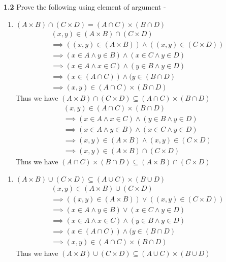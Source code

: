 \documentclass[xcolor=svgnames]{beamer}
\begin{document}
\begin{frame}
\textbf{1.2} Prove the following using element of argument - 
\begin{enumerate}
    \item $(A \times B) \cap (C \times D) = (A \cap C) \times (B \cap D)$
    \begin{align*}
       &(x,y) \in (A \times B) \cap (C \times D) &\\
       &\implies  ((x,y) \in (A \times B)) \land ((x,y) \in (C \times D)) &\\
       &\implies  (x \in A \land y \in B) \land (x \in C \land y \in D) &\\
       &\implies  (x \in A \land x \in C) \land (y \in B \land y \in D) &\\
       &\implies  (x \in (A \cap C)) \land (y \in (B \cap D) &\\
       &\implies  (x,y) \in (A \cap C) \times (B \cap D)&
    \end{align*}
    Thus we have $(A \times B) \cap (C \times D) \subseteq (A \cap C) \times (B \cap D)$
    \begin{align*}
       &(x,y) \in (A \cap C) \times (B \cap D) &\\
       &\implies  (x \in A \land x \in C) \land (y \in B \land y \in D) &\\
       &\implies  (x \in A \land y \in B) \land (x \in C \land y \in D) &\\
       &\implies  (x,y) \in (A \times B) \land (x,y) \in (C \times D) &\\
       &\implies  (x,y) \in (A \times B) \cap (C \times D)&
    \end{align*}
    Thus we have $ (A \cap C) \times (B \cap D)  \subseteq (A \times B) \cap (C \times D)$
\end{enumerate}
\end{frame}
\begin{frame}
\begin{enumerate}\addtocounter{enumi}{1}
    \item $(A \times B) \cup (C \times D) \subseteq (A \cup C) \times (B \cup D)$  
    \begin{align*}
       &(x,y) \in (A \times B) \cup (C \times D) &\\
       &\implies  ((x,y) \in (A \times B)) \lor ((x,y) \in (C \times D)) &\\
       &\implies  (x \in A \land y \in B) \lor (x \in C \land y \in D) &\\
       &\implies  (x \in A \land x \in C) \land (y \in B \land y \in D) &\\
       &\implies  (x \in (A \cap C)) \land (y \in (B \cap D) &\\
       &\implies  (x,y) \in (A \cap C) \times (B \cap D)&
    \end{align*}
    Thus we have $(A \times B) \cup (C \times D) \subseteq (A \cup C) \times (B \cup D)$  
\end{enumerate}
\end{frame}
\end{document}
